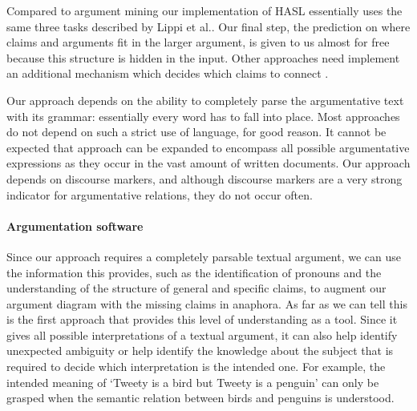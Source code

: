Compared to argument mining our implementation of HASL essentially uses the same three tasks described by Lippi et al.\cite{lippi2016argumentation}. Our final step, the prediction on where claims and arguments fit in the larger argument, is given to us almost for free because this structure is hidden in the input. Other approaches need implement an additional mechanism which decides which claims to connect \cite{cohen1987}.

Our approach depends on the ability to completely parse the argumentative text with its grammar: essentially every word has to fall into place. Most approaches do not depend on such a strict use of language, for good reason\cite{mochales2011argumentation,saintDizier2012,lawrenceReed2015}. It cannot be expected that approach can be expanded to encompass all possible argumentative expressions as they occur in the vast amount of written documents. Our approach depends on discourse markers, and although discourse markers are a very strong indicator for argumentative relations, they do not occur often\cite{lawrenceReed2015}.

\paragraph{Argumentation software}
Since our approach requires a completely parsable textual argument, we can use the information this provides, such as the identification of pronouns and the understanding of the structure of general and specific claims, to augment our argument diagram with the missing claims in anaphora. As far as we can tell this is the first approach that provides this level of understanding as a tool. Since it gives all possible interpretations of a textual argument, it can also help identify unexpected ambiguity or help identify the knowledge about the subject that is required to decide which interpretation is the intended one. For example, the intended meaning of `Tweety is a bird but Tweety is a penguin' can only be grasped when the semantic relation between birds and penguins is understood.
